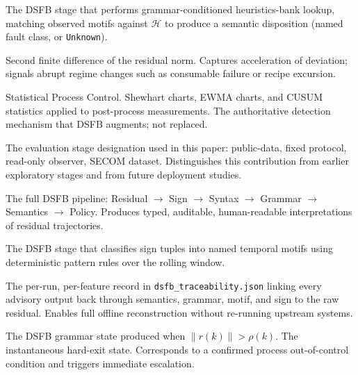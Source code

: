 \documentclass[11pt,letterpaper]{article}
\theoremstyle{scresult}
\begin{document}
\begin{description}[leftmargin=2.4cm, labelwidth=2.2cm, style=nextline,
                    itemsep=4pt, parsep=0pt]
\item[\textbf{Semantics layer}]
The DSFB stage that performs grammar-conditioned heuristics-bank lookup,
matching observed motifs against $\mathcal{H}$ to produce a semantic
disposition (named fault class, or \texttt{Unknown}).

\item[\textbf{Slew} ($\ddot{r}$)]
Second finite difference of the residual norm.  Captures acceleration of
deviation; signals abrupt regime changes such as consumable failure or recipe
excursion.

\item[\textbf{SPC}]
Statistical Process Control.  Shewhart charts, EWMA charts, and CUSUM
statistics applied to post-process measurements.  The authoritative detection
mechanism that DSFB augments; not replaced.

\item[\textbf{Stage III}]
The evaluation stage designation used in this paper: public-data, fixed
protocol, read-only observer, SECOM dataset.  Distinguishes this
contribution from earlier exploratory stages and from future deployment
studies.

\item[\textbf{Structural semiotics engine}]
The full DSFB pipeline: Residual $\to$ Sign $\to$ Syntax $\to$ Grammar $\to$
Semantics $\to$ Policy.  Produces typed, auditable, human-readable
interpretations of residual trajectories.

\item[\textbf{Syntax layer}]
The DSFB stage that classifies sign tuples into named temporal motifs using
deterministic pattern rules over the rolling window.

\item[\textbf{Traceability chain}]
The per-run, per-feature record in \texttt{dsfb\_traceability.json} linking
every advisory output back through semantics, grammar, motif, and sign to the
raw residual.  Enables full offline reconstruction without re-running upstream
systems.

\item[\textbf{Violation (grammar state)}]
The DSFB grammar state produced when $\|r(k)\| > \rho(k)$.  The
instantaneous hard-exit state.  Corresponds to a confirmed process
out-of-control condition and triggers immediate escalation.

\end{description}
\end{document}
